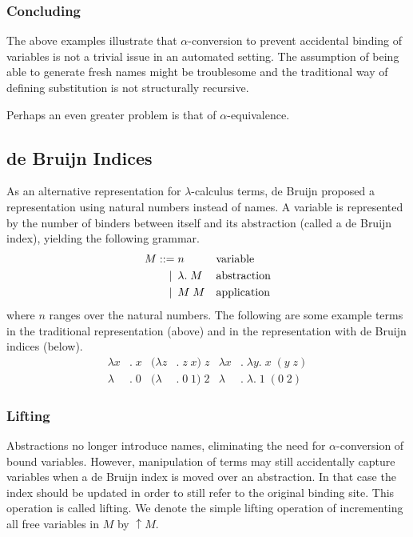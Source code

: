 \documentclass[a4paper,11pt]{article}
\begin{document}
\subsubsection*{Concluding}

The above examples illustrate that $\alpha$-conversion to prevent
accidental binding of variables is not a trivial issue in an automated
setting.
The assumption of being able to generate fresh names might be troublesome
and the traditional way of defining substitution is not structurally
recursive.

Perhaps an even greater problem is that of $\alpha$-equivalence.


\subsection{de Bruijn Indices}

As an alternative representation for $\lambda$-calculus terms, de Bruijn
proposed a representation using natural numbers instead of names.
A variable is represented by the number of binders between itself and its
abstraction (called a de Bruijn index), yielding the following grammar.
\begin{align*}
  M ::=             &\; n
  && \text{variable} \\
  \llap{\textbar\:} &\; \lambda . \; M
  && \text{abstraction} \\
  \llap{\textbar\:} &\; M \; M
  && \text{application}
\end{align*}
where $n$ ranges over the natural numbers.
The following are some example terms in the traditional representation
(above) and in the representation with de Bruijn indices (below).
\begin{align*}
  \lambda x&. \; x & (\lambda z&. \; z \; x) \; z & \lambda x&. \; \lambda y. \; x \; (y \; z)\\
  \lambda &. \; 0  & (\lambda &. \; 0 \; 1) \; 2  & \lambda &. \; \lambda . \; 1 \; (0 \; 2)
\end{align*}

\subsubsection*{Lifting}

Abstractions no longer introduce names, eliminating the need for
$\alpha$-conversion of bound variables.
However, manipulation of terms may still accidentally capture
variables when a de Bruijn index is moved over an abstraction.
In that case the index should be updated in order to still refer to the
original binding site.
This operation is called lifting. We denote the simple lifting operation
of incrementing all free variables in $M$ by $\uparrow \! M$.
\end{document}
